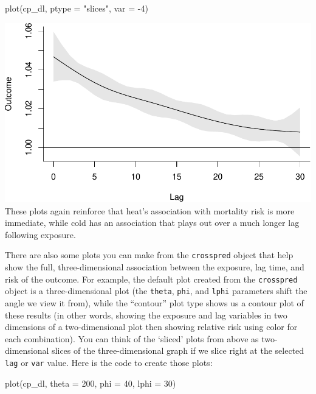 \documentclass[
]{book}
\newenvironment{Shaded}{\begin{snugshade}}{\end{snugshade}}
\newcommand{\AttributeTok}[1]{\textcolor[rgb]{0.77,0.63,0.00}{#1}}
\newcommand{\DecValTok}[1]{\textcolor[rgb]{0.00,0.00,0.81}{#1}}
\newcommand{\FunctionTok}[1]{\textcolor[rgb]{0.00,0.00,0.00}{#1}}
\newcommand{\NormalTok}[1]{#1}
\newcommand{\SpecialCharTok}[1]{\textcolor[rgb]{0.00,0.00,0.00}{#1}}
\newcommand{\StringTok}[1]{\textcolor[rgb]{0.31,0.60,0.02}{#1}}
\begin{document}
\begin{Shaded}
\begin{Highlighting}[]
\FunctionTok{plot}\NormalTok{(cp\_dl, }\AttributeTok{ptype =} \StringTok{"slices"}\NormalTok{, }\AttributeTok{var =} \SpecialCharTok{{-}}\DecValTok{4}\NormalTok{)}
\end{Highlighting}
\end{Shaded}

\includegraphics{adv_epi_analysis_files/figure-latex/unnamed-chunk-106-2.pdf}
These plots again reinforce that heat's association with mortality risk is more immediate,
while cold has an association that plays out over a much longer lag following exposure.

There are also some plots you can make from the \texttt{crosspred} object that help show the full,
three-dimensional association between the exposure, lag time, and risk of the outcome.
For example, the default plot created from the \texttt{crosspred} object is a three-dimensional
plot (the \texttt{theta}, \texttt{phi}, and \texttt{lphi} parameters shift the angle we view it from), while
the ``contour'' plot type shows us a contour plot of these results (in other words, showing
the exposure and lag variables in two dimensions of a two-dimensional plot then showing
relative risk using color for each combination). You can think of the `sliced' plots from above as two-dimensional slices of the three-dimensional graph if we slice right at the selected \texttt{lag} or \texttt{var} value. Here is the code to create those plots:

\begin{Shaded}
\begin{Highlighting}[]
\FunctionTok{plot}\NormalTok{(cp\_dl, }\AttributeTok{theta =} \DecValTok{200}\NormalTok{, }\AttributeTok{phi =} \DecValTok{40}\NormalTok{, }\AttributeTok{lphi =} \DecValTok{30}\NormalTok{)}
\end{Highlighting}
\end{Shaded}
\end{document}
